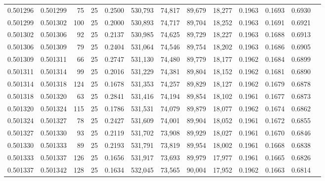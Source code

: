 \begin{tabular}{rrrrrrrrrrrrr}
0.501296 & 0.501299 &  75 &  25 &                                     0.2500 & 530,793 &  74,817 &  89,679 &  18,277 & 0.1963 & 0.1693 & 0.6930 \\
0.501299 & 0.501302 & 100 &  25 &                                     0.2000 & 530,893 &  74,717 &  89,704 &  18,252 & 0.1963 & 0.1691 & 0.6921 \\
0.501302 & 0.501306 &  92 &  25 &                                     0.2137 & 530,985 &  74,625 &  89,729 &  18,227 & 0.1963 & 0.1688 & 0.6913 \\
0.501306 & 0.501309 &  79 &  25 &                                     0.2404 & 531,064 &  74,546 &  89,754 &  18,202 & 0.1963 & 0.1686 & 0.6905 \\
0.501309 & 0.501311 &  66 &  25 &                                     0.2747 & 531,130 &  74,480 &  89,779 &  18,177 & 0.1962 & 0.1684 & 0.6899 \\
0.501311 & 0.501314 &  99 &  25 &                                     0.2016 & 531,229 &  74,381 &  89,804 &  18,152 & 0.1962 & 0.1681 & 0.6890 \\
0.501314 & 0.501318 & 124 &  25 &                                     0.1678 & 531,353 &  74,257 &  89,829 &  18,127 & 0.1962 & 0.1679 & 0.6878 \\
0.501318 & 0.501320 &  63 &  25 &                                     0.2841 & 531,416 &  74,194 &  89,854 &  18,102 & 0.1961 & 0.1677 & 0.6873 \\
0.501320 & 0.501324 & 115 &  25 &                                     0.1786 & 531,531 &  74,079 &  89,879 &  18,077 & 0.1962 & 0.1674 & 0.6862 \\
0.501324 & 0.501327 &  78 &  25 &                                     0.2427 & 531,609 &  74,001 &  89,904 &  18,052 & 0.1961 & 0.1672 & 0.6855 \\
0.501327 & 0.501330 &  93 &  25 &                                     0.2119 & 531,702 &  73,908 &  89,929 &  18,027 & 0.1961 & 0.1670 & 0.6846 \\
0.501330 & 0.501333 &  89 &  25 &                                     0.2193 & 531,791 &  73,819 &  89,954 &  18,002 & 0.1961 & 0.1668 & 0.6838 \\
0.501333 & 0.501337 & 126 &  25 &                                     0.1656 & 531,917 &  73,693 &  89,979 &  17,977 & 0.1961 & 0.1665 & 0.6826 \\
0.501337 & 0.501342 & 128 &  25 &                                     0.1634 & 532,045 &  73,565 &  90,004 &  17,952 & 0.1962 & 0.1663 & 0.6814 \\

\end{tabular}

